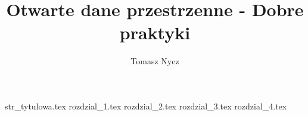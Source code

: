 \documentclass[12pt]{scrbook}
\author{Tomasz Nycz}
\title{Otwarte dane przestrzenne - Dobre praktyki}
\date{}
\begin{document}
\setlength{\parindent}{1cm} %

\newcommand{\szare}[1]{
	\begin{mdframed}[backgroundcolor=code-gray]
		#1
	\end{mdframed}
}
\newenvironment{prawne}
{\begin{mdframed}[topline=false,bottomline=false,rightline=false,leftmargin=-10pt,leftline=true,innerrightmargin=0pt,innerlinewidth=5pt,linecolor=ExerciseColor,backgroundcolor=light-gray]}{\end{mdframed}}


{str_tytulowa.tex}
{rozdzial_1.tex}
{rozdzial_2.tex}
{rozdzial_3.tex}
{rozdzial_4.tex}
\tableofcontents
\end{document}
